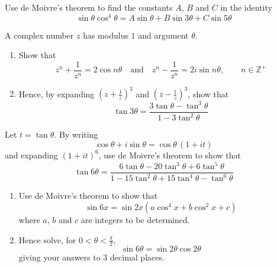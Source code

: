 \documentclass[leqno]{article}
\begin{document}
\djsFrontMatter
\begin{enumerate}[
  label=\textbf{\arabic*.},
  leftmargin=*,
  topsep=0pt,
  partopsep=0pt,
  parsep=0pt
]

\questionitem

Use de Moivre's theorem to find the constants $A$, $B$ and $C$ in the identity
\[
\sin\theta\cos^4\theta = A\sin\theta + B\sin 3\theta + C\sin 5\theta
\]

\newpage

\questionitem

A complex number $z$ has modulus $1$ and argument $\theta$. \\
\begin{enumerate}[label=\textbf{(\alph*)}]
  \item Show that
  \[
  z^n + \frac{1}{z^n} = 2\cos n\theta
  \quad\text{and}\quad
  z^n - \frac{1}{z^n} = 2i\sin n\theta,
  \qquad n \in \mathbb{Z}^+
  \]
  \item Hence, by expanding $\left(z + \frac{1}{z}\right)^3$ and $\left(z - \frac{1}{z}\right)^3$, show that
  \[
  \tan 3\theta = \frac{3\tan\theta - \tan^3\theta}{1 - 3\tan^2\theta}
  \]
\end{enumerate}

\newpage

\questionitem

Let $t=\tan\theta$. By writing
\[
\cos\theta+i\sin\theta=\cos\theta\,(1+it)
\]
and expanding $(1+it)^6$, use de Moivre's theorem to show that
\[
\tan 6\theta=\frac{6\tan\theta-20\tan^3\theta+6\tan^5\theta}{1-15\tan^2\theta+15\tan^4\theta-\tan^6\theta}
\]


\newpage

\questionitem

\begin{enumerate}[label=\textbf{(\alph*)}]
  \item Use de Moivre's theorem to show that
  \[
  \sin 6x = \sin 2x\left(a\cos^4 x + b\cos^2 x + c\right)
  \]
  where $a$, $b$ and $c$ are integers to be determined.  \\
  \item Hence solve, for $0<\theta<\frac{\pi}{2}$,
  \[
  \sin 6\theta = \sin 2\theta \cos 2\theta
  \]
  giving your answers to $3$ decimal places.  \\
\end{enumerate}


\end{enumerate}
\end{document}
